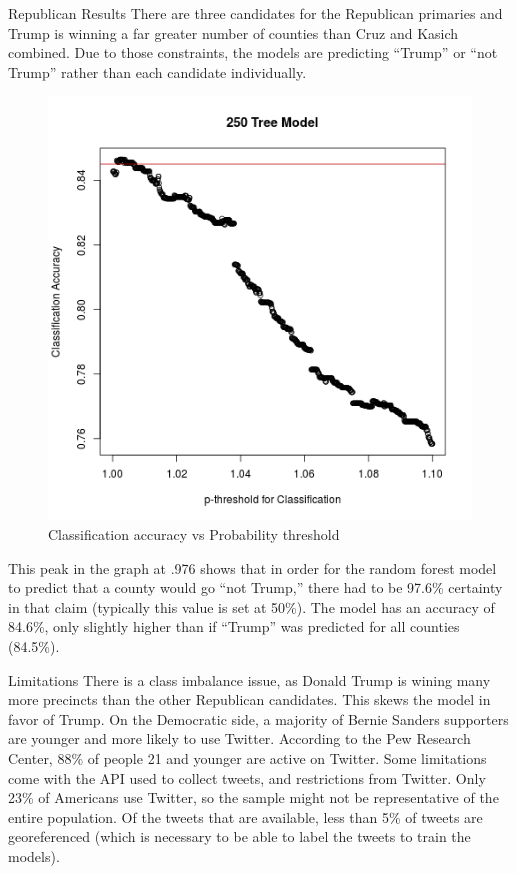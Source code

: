 \documentclass[final]{beamer}
\newlength{\onecolwid}
\newlength{\twocolwid}
\begin{document}
\begin{frame}[t]
\begin{columns}[t]
\begin{column}{\twocolwid}
\begin{columns}[t,totalwidth=\twocolwid]
\begin{column}{\onecolwid}
\begin{block}{Republican Results}
There are three candidates for the Republican primaries and Trump is winning a far greater number of counties than Cruz and Kasich combined.  Due to those constraints, the models are predicting ``Trump'' or ``not Trump'' rather than each candidate individually. 
\begin{figure}[h!]
\includegraphics[width=0.25\linewidth]{RFmodelaccuracy250.png}
\caption{Classification accuracy vs Probability threshold}
\end{figure}
\begin{table}
\centering
{}
\caption{Random Forest 250 Trees Confusion Matrix}
\end{table}

This peak in the graph at .976 shows that in order for the random forest model to predict that a county would go ``not Trump,'' there had to be 97.6\% certainty in that claim (typically this value is set at 50\%).  The model has an accuracy of 84.6\%, only slightly higher than if ``Trump'' was predicted for all counties (84.5\%).

\end{block}


	


\begin{block}{Limitations}
There is a class imbalance issue, as Donald Trump is wining many more precincts than the other Republican candidates.  This skews the model in favor of Trump.  On the Democratic side, a majority of Bernie Sanders supporters are younger and more likely to use Twitter.  According to the Pew Research Center, 88\% of people 21 and younger are active on Twitter.  Some limitations come with the API used to collect tweets, and restrictions from Twitter.  Only 23\% of Americans use Twitter, so the sample might not be representative of the entire population.  Of the tweets that are available, less than 5\% of tweets are georeferenced (which is necessary to be able to label the tweets to train the models).  
	

\end{block}
\end{column}
\end{columns}
\end{column}
\end{columns}
\end{frame}
\end{document}
